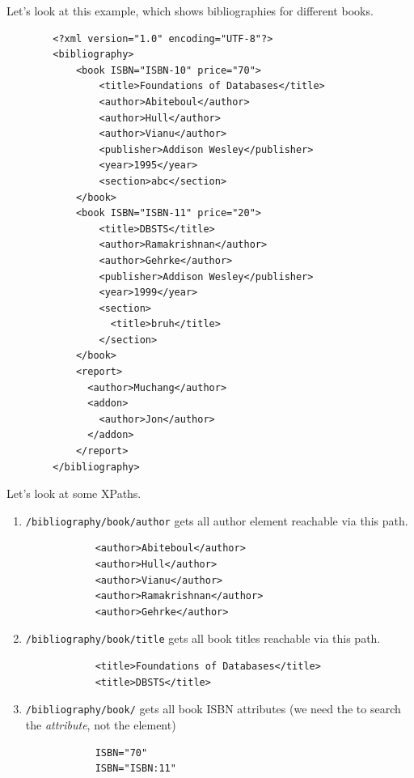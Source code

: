 \documentclass{article}
\begin{document}
    \begin{example}
      Let's look at this example, which shows bibliographies for different books. 
      \begin{lstlisting}
        <?xml version="1.0" encoding="UTF-8"?>
        <bibliography>
            <book ISBN="ISBN-10" price="70">
                <title>Foundations of Databases</title>
                <author>Abiteboul</author>
                <author>Hull</author>
                <author>Vianu</author>
                <publisher>Addison Wesley</publisher>
                <year>1995</year>
                <section>abc</section>
            </book>
            <book ISBN="ISBN-11" price="20">
                <title>DBSTS</title>
                <author>Ramakrishnan</author>
                <author>Gehrke</author>
                <publisher>Addison Wesley</publisher>
                <year>1999</year>
                <section>
                  <title>bruh</title>
                </section>
            </book>
            <report>
              <author>Muchang</author>
              <addon>
                <author>Jon</author>
              </addon>
            </report>
        </bibliography> 
      \end{lstlisting}
      Let's look at some XPaths. 
      \begin{enumerate}
        \item \texttt{/bibliography/book/author} gets all author element reachable via this path.
          \begin{lstlisting}
            <author>Abiteboul</author>
            <author>Hull</author>
            <author>Vianu</author>
            <author>Ramakrishnan</author>
            <author>Gehrke</author>
          \end{lstlisting}

        \item \texttt{/bibliography/book/title} gets all book titles reachable via this path. 
          \begin{lstlisting}
            <title>Foundations of Databases</title>
            <title>DBSTS</title>
          \end{lstlisting}

        \item \texttt{/bibliography/book/\@ISBN} gets all book ISBN attributes (we need the \texttt{\@} to search the \textit{attribute}, not the element)
          \begin{lstlisting}
            ISBN="70"
            ISBN="ISBN:11"
          \end{lstlisting}


\end{enumerate}
\end{example}
\end{document}

